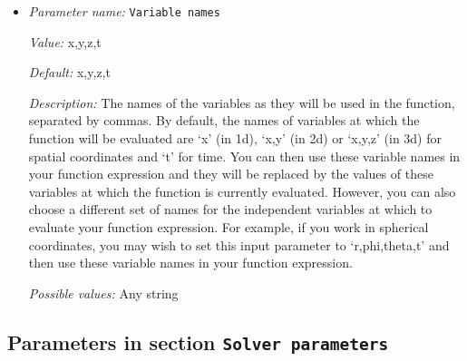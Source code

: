 \begin{itemize}
{\it Possible values:} Any string
\item {\it Parameter name:} {\tt Variable names}
\label{parameters:Prescribed Stokes solution/Velocity function/Variable names}
\label{parameters:Prescribed_20Stokes_20solution/Velocity_20function/Variable_20names}


{\it Value:} x,y,z,t


{\it Default:} x,y,z,t


{\it Description:} The names of the variables as they will be used in the function, separated by commas. By default, the names of variables at which the function will be evaluated are `x' (in 1d), `x,y' (in 2d) or `x,y,z' (in 3d) for spatial coordinates and `t' for time. You can then use these variable names in your function expression and they will be replaced by the values of these variables at which the function is currently evaluated. However, you can also choose a different set of names for the independent variables at which to evaluate your function expression. For example, if you work in spherical coordinates, you may wish to set this input parameter to `r,phi,theta,t' and then use these variable names in your function expression.


{\it Possible values:} Any string
\end{itemize}

\subsection{Parameters in section \tt Solver parameters}
\label{parameters:Solver_20parameters}

